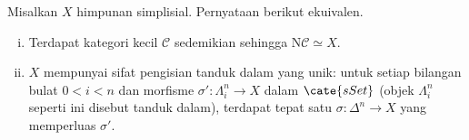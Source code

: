 \begin{proposition}\label{prop:inner-horn-filling}
	Misalkan $X$ himpunan simplisial. Pernyataan berikut ekuivalen.
	\begin{enumerate}[(i)]
		\item Terdapat kategori kecil $\mathcal{C}$ sedemikian sehingga
		$\mathrm{N}\mathcal{C}\simeq X$.
		\item $X$ mempunyai sifat pengisian tanduk dalam yang unik: untuk setiap
		bilangan bulat $0<i<n$ dan morfisme
		$\sigma':\Lambda^n_i\to X$ dalam $\cate{sSet}$ (objek
		$\Lambda^n_i$ seperti ini disebut tanduk dalam), terdapat tepat satu
		$\sigma:\Delta^n\to X$ yang memperluas $\sigma'$.
	\end{enumerate}
\end{proposition}
